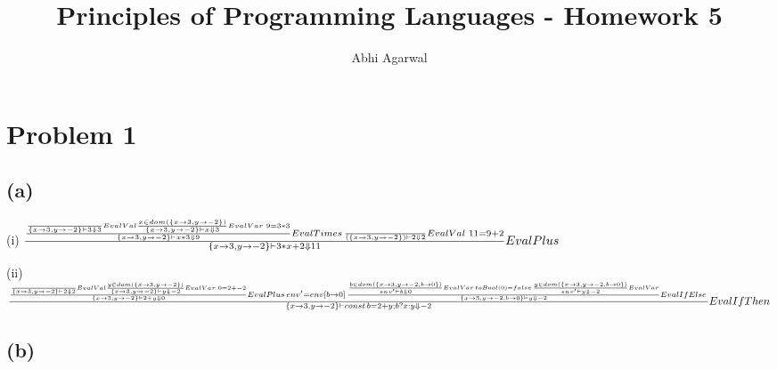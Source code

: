 \documentclass[11pt, oneside]{article}
\title{Principles of Programming Languages - Homework 5}
\author{Abhi Agarwal}
\date{}
\let\emptyset\varnothing
\newcommand{\forceindent}{\leavevmode{\parindent=1.5em\indent}}
\begin{document}
\maketitle
\section{Problem 1}
\subsection*{(a)}
\forceindent \par (i) 
$
\frac{
	\frac{
		\frac{
		}
		{
			\{x \rightarrow 3, y \rightarrow -2\} \vdash 3 \Downarrow 3
		} EvalVal
		\frac{
			x \in dom(\{x \rightarrow 3, y \rightarrow -2\})
		}
		{
			\{x \rightarrow 3, y \rightarrow -2\} \vdash x \Downarrow 3
		} EvalVar \thinspace \thinspace
		9 = 3 * 3
	}
	{
		\{x \rightarrow 3, y \rightarrow -2\} \vdash x * 3 \Downarrow 9
	} EvalTimes \thinspace
	\frac{
	}{
		(\{x \rightarrow 3, y \rightarrow -2\}) \vdash 2 \Downarrow 2
	} EvalVal \thinspace \thinspace
	11 = 9 + 2
	{
	}
}{
	\{x \rightarrow 3, y \rightarrow -2\} \vdash 3 * x + 2 \Downarrow 11
} EvalPlus
$

\par (ii)
$
\frac{
	\frac{
			\frac {
			}
			{
				\{x \rightarrow 3, y \rightarrow -2\} \vdash 2 \Downarrow 2
			} EvalVal
			\frac {
				y \in dom(\{x \rightarrow 3, y \rightarrow -2\})
			}
			{
				\{x \rightarrow 3, y \rightarrow -2\} \vdash y \Downarrow -2
			} EvalVar \thinspace \thinspace
			0 = 2 + -2
		}
		{
			\{x \rightarrow 3, y \rightarrow -2\} \vdash 2 + y \Downarrow 0
		} EvalPlus \thinspace
	env' = env [b \rightarrow 0] \thinspace
	\frac{
		\frac{
			b \in dom(\{x \rightarrow 3, y \rightarrow -2, b \rightarrow 0\})
		}
		{
			env' \vdash b \Downarrow 0
		} EvalVar \thinspace
		toBool(0) = false \thinspace
		\frac{
			y \in dom(\{x \rightarrow 3, y \rightarrow -2, b \rightarrow 0\})
		}
		{
			env' \vdash y \Downarrow -2
		} EvalVar
	}
	{
		\{x \rightarrow 3, y \rightarrow -2, b \rightarrow 0\} \vdash y \Downarrow -2
	} EvalIfElse \thinspace
}{
	\{x \rightarrow 3, y \rightarrow -2\} \vdash const \thinspace b = 2 + y; b ? x : y \Downarrow -2
} EvalIfThen
$

\subsection*{(b)}
\end{document}
